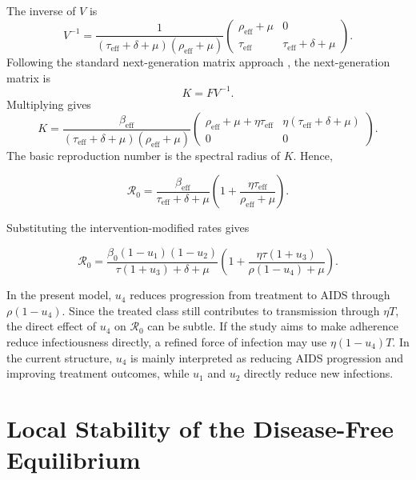 \documentclass[12pt,a4paper,oneside]{report}
\newcommand{\Rzero}{\mathcal{R}_0}
\newcommand{\beff}{\beta_{\mathrm{eff}}}
\newcommand{\taueff}{\tau_{\mathrm{eff}}}
\newcommand{\rhoeff}{\rho_{\mathrm{eff}}}
\begin{document}
The inverse of $V$ is
\[
V^{-1}=
\frac{1}{(\taueff+\delta+\mu)(\rhoeff+\mu)}
\begin{pmatrix}
\rhoeff+\mu & 0\\
\taueff & \taueff+\delta+\mu
\end{pmatrix}.
\]
Following the standard next-generation matrix approach \citep{Diekmann1990,VanDenDriessche2002}, the next-generation matrix is
\[
K=FV^{-1}.
\]
Multiplying gives
\[
K=
\frac{\beff}{(\taueff+\delta+\mu)(\rhoeff+\mu)}
\begin{pmatrix}
\rhoeff+\mu+\eta\taueff &
\eta(\taueff+\delta+\mu)\\
0&0
\end{pmatrix}.
\]
The basic reproduction number is the spectral radius of $K$. Hence,
\begin{mathbox}
\begin{equation}
\Rzero=
\frac{\beff}{\taueff+\delta+\mu}
\left(
1+\frac{\eta\taueff}{\rhoeff+\mu}
\right).
\label{eq:R0_general_eff}
\end{equation}
\end{mathbox}
Substituting the intervention-modified rates gives
\begin{mathbox}
\begin{equation}
\Rzero=
\frac{\beta_0(1-u_1)(1-u_2)}
{\tau(1+u_3)+\delta+\mu}
\left(
1+\frac{\eta\tau(1+u_3)}
{\rho(1-u_4)+\mu}
\right).
\label{eq:R0_intervention_final}
\end{equation}
\end{mathbox}

\begin{remarkbox}[title={Important interpretation of $u_4$}]
In the present model, $u_4$ reduces progression from treatment to AIDS through $\rho(1-u_4)$. Since the treated class still contributes to transmission through $\eta T$, the direct effect of $u_4$ on $\Rzero$ can be subtle. If the study aims to make adherence reduce infectiousness directly, a refined force of infection may use $\eta(1-u_4)T$. In the current structure, $u_4$ is mainly interpreted as reducing AIDS progression and improving treatment outcomes, while $u_1$ and $u_2$ directly reduce new infections.
\end{remarkbox}

\section{Local Stability of the Disease-Free Equilibrium}
\end{document}
